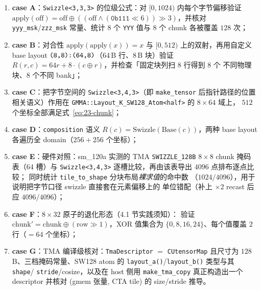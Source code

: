 \begin{enumerate}[leftmargin=2.2em]
\item \textbf{case A}：\texttt{Swizzle\allowbreak{}<3,\allowbreak{}3,\allowbreak{}3>} 的位级公式：对
$[0,1024)$ 内每个字节偏移验证 $\text{apply}(\text{off})=\text{off}\oplus
((\text{off}\wedge(\texttt{0b111}\ll6))\gg3)$，并核对
\texttt{yyy\_msk}/\texttt{zzz\_msk} 常量、统计 $8$ 个 \texttt{YYY} 值与
$8$ 个 chunk 各被覆盖 $128$ 次；
\item \textbf{case B}：对合性 $\text{apply}(\text{apply}(x))=x$ 与
$[0,512)$ 上的双射，再用自定义 base layout
$\texttt{\allowbreak{}(8,\allowbreak{}8):\allowbreak{}(64,\allowbreak{}8)}$（64\,B 行、8\,B 块）验证
$R(r,c)=64r+8\cdot(c\oplus r)$，并检查「固定块列扫 $8$ 行得到 $8$ 个
不同物理块、$8$ 个不同 bank」；
\item \textbf{case C}：把字节空间的 \texttt{Swizzle\allowbreak{}<3,\allowbreak{}4,\allowbreak{}3>}（即
\texttt{make\_tensor} 后指针路径的位置相关语义）作用在
\texttt{GMMA::\allowbreak{}Layout\_\allowbreak{}K\_\allowbreak{}SW128\_\allowbreak{}Atom\allowbreak{}<half>} 的 $8\times64$ 域上，
$512$ 个坐标全部满足式~\eqref{eq:23-chunk}；
\item \textbf{case D}：\texttt{composition} 语义
$R(c)=\text{Swizzle}(\text{Base}(c))$，两种 base layout 各遍历全
domain（$256+256$ 个坐标）；
\item \textbf{case E}：硬件对照：sm\_120a 实测的 TMA
\texttt{SWIZZLE\_\allowbreak{}128\allowbreak{}B} $8\times8$ chunk 掩码表（$64$ 槽）与
\texttt{Swizzle\allowbreak{}<3,\allowbreak{}4,\allowbreak{}3>} 逐槽比较，再由该表导出 $4096$ 点排布逐点比较；
同时统计 \texttt{tile\_\allowbreak{}to\_\allowbreak{}shape} 分块布局\emph{裸求值}的命中数
（$1024/4096$），用于说明把字节口径 swizzle 直接套在元素偏移上的
单位错配（补上 $\times2$ recast 后应 $4096/4096$）；
\item \textbf{case F}：$8\times32$ 原子的退化形态（4.1 节实践须知）：
验证 $\text{chunk}'=\text{chunk}\oplus(\text{row}\gg1)$，XOR 值集合为
$\{0,8,16,24\}$、每个值覆盖 $2$ 行（$=64$ 个坐标）；
\item \textbf{case G}：TMA 编译级核对：\texttt{Tma\allowbreak{}Descriptor}
$=$ \texttt{CUtensorMap} 且尺寸为 $128$\,B、三档掩码常量、SW128 atom 的
\texttt{layout\_a()}/\texttt{layout\_b()} 类型与其 \texttt{shape}/
\texttt{stride}/cosize，以及在 host 侧用 \texttt{make\_\allowbreak{}tma\_\allowbreak{}copy}
真正构造出一个 descriptor 并核对 (gmem 张量, CTA tile) 的
size/stride 推导。
\end{enumerate}

